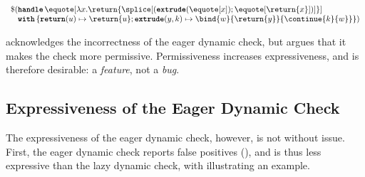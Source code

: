 \begin{code} 
 \begin{source}
  $\begin{array}{l}
      \$ (\textbf{\texttt{handle}} \, \equote[{\lambda x. \return{\splice[({{\textbf{\texttt{extrude}}(\equote[x])}; \equote[\return{x}]})]}}] \\
      \;\;\,\, \textbf{\texttt{with}} \, \{ \textbf{\texttt{return}}(u) \mapsto {\return{u}}; \textbf{\texttt{extrude}}(y, k) \mapsto {\bind{w}{\return{y}}{\continue{k}{w}}}\})
    \end{array}$
 \end{source}
 \label{listing:eager-scope-extrusion-unsafe-continue}
\end{code}


\citet{kiselyov-14} acknowledges the incorrectness of the eager dynamic check, but argues that it makes the check more permissive. Permissiveness increases expressiveness, and is therefore desirable: a \textit{feature}, not a \textit{bug}. 

\subsection{Expressiveness of the Eager Dynamic Check}\label{subsection:eager-dynamic-expressiveness}
The expressiveness of the eager dynamic check, however, is not without issue. First, the eager dynamic check reports false positives (), and is thus less expressive than the lazy dynamic check, with  illustrating an example.

